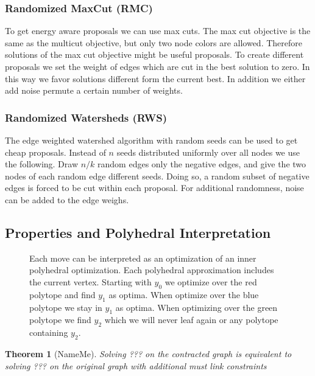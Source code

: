 \documentclass[10pt,twocolumn,letterpaper]{article}
\newtheorem{theorem}{Theorem}
\begin{document}
\subsubsection{Randomized MaxCut  (RMC)}

To get energy aware proposals we can use max cuts.
The max cut objective is the same as
the multicut objective, but only two 
node colors are allowed.
Therefore solutions of the max cut objective
might be useful proposals.
To create different proposals we set 
the weight of edges which are cut 
in the best solution to zero.
In this way we favor solutions 
different form the current best. 
In addition we either add noise permute a certain number of weights.


\subsubsection{Randomized Watersheds (RWS)}

The edge weighted watershed algorithm \cite{meyer_2013}
with random seeds can be used to get 
cheap proposals. Instead of $n$ seeds distributed uniformly
over all nodes we use the following.
Draw $n/k$ random edges only the negative edges, 
and give the two nodes of each random edge different seeds.
Doing so, a random subset of negative edges is forced
to be cut within each proposal.
For additional randomness, noise can be added to
the edge weighs.





\subsection{Properties and Polyhedral Interpretation}
\begin{figure}
\centering

\caption{Each move can be interpreted as an optimization of an inner polyhedral optimization.
Each polyhedral approximation includes the current vertex. Starting with $y_0$ we optimize over the red polytope 
and find $y_1$ as optima. When optimize over the blue polytope we stay in $y_1$ as optima.
When optimizing over the green polytope we find $y_2$ which we will never leaf again or any polytope containing $y_2$. 
}
\end{figure}


\begin{theorem}[NameMe]
Solving ??? on the contracted graph is 
equivalent to solving ??? on the 
original graph with additional 
must link constraints
\end{theorem}
\end{document}

